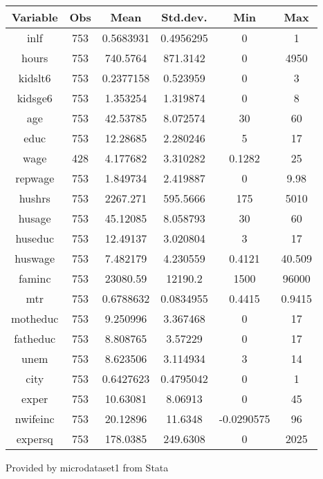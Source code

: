 \documentclass[10pt,towside,a4paper]{article}
\begin{document}
\begin{Center}
	

	 \label{tab:title} 
	
	\begin{tabular}{|c |c |c |c |c |c |}
		\toprule
		Variable &Obs & Mean & Std.dev. & Min & Max \\ 
		\midrule
		inlf & 753 & 0.5683931 & 0.4956295 & 0 & 1\\
		hours & 753 & 740.5764 & 871.3142 & 0 & 4950 \\
		kidslt6 & 753 & 0.2377158 & 0.523959 & 0 & 3\\
		kidsge6 & 753 & 1.353254 & 1.319874 & 0 & 8\\
		age & 753 & 42.53785 & 8.072574 & 30 & 60\\
		educ & 753 & 12.28685 & 2.280246 & 5 & 17\\
		wage & 428 & 4.177682 & 3.310282  & 0.1282 & 25\\
		repwage & 753 & 1.849734 & 2.419887 & 0 & 9.98\\
		hushrs & 753 & 2267.271 & 595.5666 & 175 & 5010\\
		husage & 753 & 45.12085 & 8.058793 & 30 & 60\\
		huseduc & 753 & 12.49137 & 3.020804 & 3 & 17\\
		huswage & 753 & 7.482179 & 4.230559 & 0.4121 & 40.509\\
		faminc & 753 & 23080.59 & 12190.2 & 1500 & 96000\\
		mtr & 753 & 0.6788632 & 0.0834955 & 0.4415 & 0.9415\\
		motheduc & 753 & 9.250996 & 3.367468 & 0 & 17\\
		fatheduc & 753 & 8.808765 & 3.57229 & 0 & 17\\
		unem & 753 & 8.623506 & 3.114934 & 3 & 14\\
		city & 753 & 0.6427623 & 0.4795042 & 0 & 1\\
		exper & 753 & 10.63081 & 8.06913 & 0 & 45\\
		nwifeinc & 753 & 20.12896 & 11.6348 & -0.0290575 & 96\\
		expersq & 753 & 178.0385 & 249.6308 & 0 & 2025\\
		\bottomrule
		
	\end{tabular} \par
	
	Provided by microdataset1 from Stata

\end{Center}	
	
\end{document}
